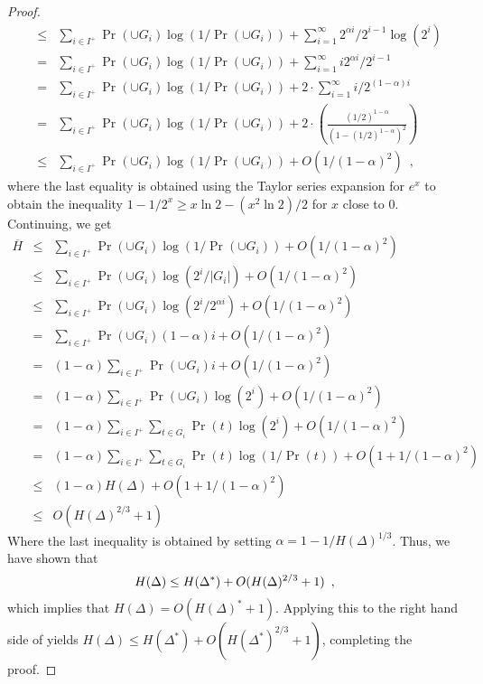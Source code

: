 \documentclass[lotsofwhite]{patmorin}
\begin{document}
\begin{proof}
\begin{eqnarray*}
 & \le & \sum_{i\in I^+}\Pr(\cup G_{i})\log(1/\Pr(\cup G_{i})) 
         + \sum_{i=1}^\infty 2^{\alpha i}/2^{i-1}\log(2^{i}) \\
 &  =  & \sum_{i\in I^+}\Pr(\cup G_{i})\log(1/\Pr(\cup G_{i})) 
         + \sum_{i=1}^\infty i2^{\alpha i}/2^{i-1} \\
 &  =  & \sum_{i\in I^+}\Pr(\cup G_{i})\log(1/\Pr(\cup G_{i})) 
         + 2\cdot\sum_{i=1}^{\infty} i/2^{(1-\alpha)i} \\
 &  =  & \sum_{i\in I^+}\Pr(\cup G_{i})\log(1/\Pr(\cup G_{i})) 
         + 2\cdot\left(\frac{(1/2)^{1-\alpha}}{(1-(1/2)^{1-\alpha})^2}\right) \\
 & \le & \sum_{i\in I^+}\Pr(\cup G_{i})\log(1/\Pr(\cup G_{i})) 
         + O(1/(1-\alpha)^2) \enspace ,
\end{eqnarray*}
where the last equality is obtained using the Taylor series expansion
for $e^{x}$ to obtain the inequality $1-1/2^{x} \ge x\ln 2 - (x^2\ln 2)/2$
for $x$ close to 0.  Continuing, we get 
\begin{eqnarray*}
\overline H
  & \le & \sum_{i\in I^+}\Pr(\cup G_{i})\log(1/\Pr(\cup G_{i})) 
         + O(1/(1-\alpha)^2) \\
  & \le & \sum_{i\in I^+}\Pr(\cup G_{i})\log(2^i/|G_i|)
         + O(1/(1-\alpha)^2) \\
  & \le & \sum_{i\in I^+}\Pr(\cup G_{i})\log(2^i/2^{\alpha i})
         + O(1/(1-\alpha)^2) \\
  &  =  & \sum_{i\in I^+}\Pr(\cup G_{i})(1-\alpha) i
         + O(1/(1-\alpha)^2) \\
  &  =  & (1-\alpha)\sum_{i\in I^+}\Pr(\cup G_{i}) i
         + O(1/(1-\alpha)^2) \\
  &  =  & (1-\alpha)\sum_{i\in I^+}\Pr(\cup G_{i})\log(2^i)
         + O(1/(1-\alpha)^2) \\
  &  =  & (1-\alpha)\sum_{i\in I^+}\sum_{t\in G_i}\Pr(t)\log(2^i)
         + O(1/(1-\alpha)^2) \\
  &  =  & (1-\alpha)\sum_{i\in I^+}\sum_{t\in G_i}\Pr(t)\log(1/\Pr(t))
         + O(1+1/(1-\alpha)^2) \\
  & \le & (1-\alpha)H(\Delta) + O(1+1/(1-\alpha)^2) \\
  & \le &  O(H(\Delta)^{2/3}+ 1)
\end{eqnarray*} 
Where the last inequality is obtained by setting 
$\alpha=1-1/H(\Delta)^{1/3}$.  Thus, we have shown that
\begin{equation}
  H(\Delta) \le H(\Delta^*) + O(H(\Delta)^{2/3}+1) \enspace ,
   \eqlabelx{almost-last}
\end{equation}
which implies that $H(\Delta) = O(H(\Delta)^*+1)$.  Applying this to
the right hand side of  yields $H(\Delta) \le
H(\Delta^*) + O(H(\Delta^*)^{2/3} + 1)$, completing the proof.
\end{proof}
\end{document}
